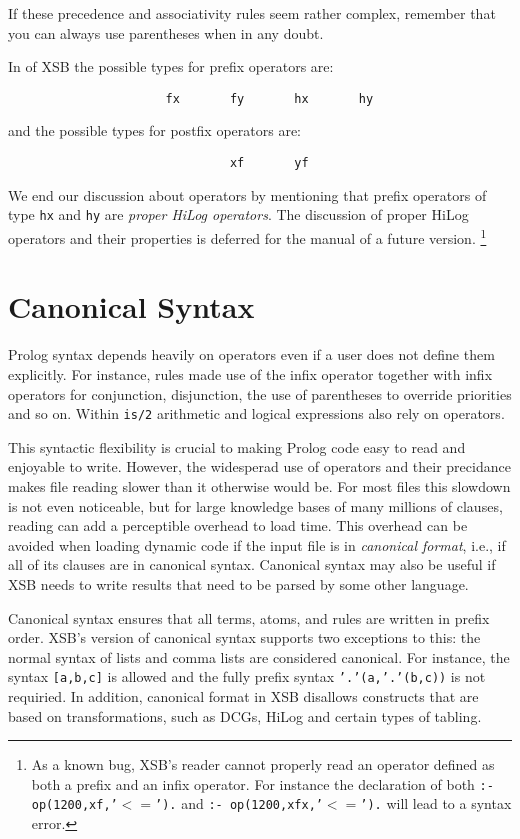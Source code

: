 If these precedence and associativity rules seem rather complex, remember
that you can always use parentheses when in any doubt.

In \version{} of XSB the possible types for prefix operators are:
\begin{verbatim}
                      fx       fy       hx       hy
\end{verbatim}
and the possible types for postfix operators are:
\begin{verbatim}
                               xf       yf
\end{verbatim}

We end our discussion about operators by mentioning that prefix
operators of type {\tt hx} and {\tt hy} are {\em proper HiLog
  operators}.  The discussion of proper HiLog operators and their
properties is deferred for the manual of a future version.
\footnote{As a known bug, XSB's reader cannot properly read an
  operator defined as both a prefix and an infix operator.  For
  instance the declaration of both {\tt :- op(1200,xf,'$<=$').} and 
{\tt :- op(1200,xfx,'$<=$').} will lead to a syntax error.}

\section{Canonical Syntax} \label{sec:canonical}
%
Prolog syntax depends heavily on operators even if a user does not
define them explicitly.  For instance, rules made use of the infix
\mif{} operator together with infix operators for conjunction,
disjunction, the use of parentheses to override priorities and so on.
Within {\tt is/2} arithmetic and logical expressions also rely on
operators.  

This syntactic flexibility is crucial to making Prolog code easy to
read and enjoyable to write.  However, the widesperad use of operators
and their precidance makes file reading slower than it otherwise would
be.  For most files this slowdown is not even noticeable, but for
large knowledge bases of many millions of clauses, reading can add a
perceptible overhead to load time.  This overhead can be avoided when
loading dynamic code if the input file is in {\em canonical format},
i.e., if all of its clauses are in canonical syntax.  Canonical syntax
may also be useful if XSB needs to write results that need to be
parsed by some other language.

Canonical syntax ensures that all terms, atoms, and rules are written
in prefix order.  XSB's version of canonical syntax supports two
exceptions to this: the normal syntax of lists and comma lists are
considered canonical.  For instance, the syntax {\tt [a,b,c]} is
allowed and the fully prefix syntax {\tt '.'(a,'.'(b,c))} is not
requiried.  In addition, canonical format in XSB disallows constructs
that are based on transformations, such as DCGs, HiLog and certain
types of tabling.

